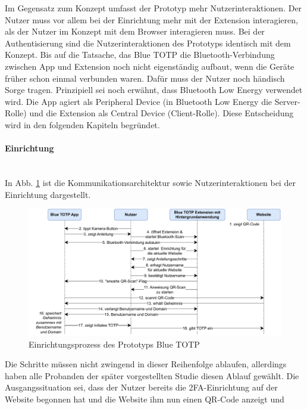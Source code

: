 Im Gegensatz zum Konzept umfasst der Prototyp mehr Nutzerinteraktionen. Der 
Nutzer muss vor allem bei der Einrichtung mehr mit der Extension 
interagieren, als der Nutzer im Konzept mit dem Browser interagieren muss. 
Bei der Authentisierung sind die Nutzerinteraktionen des Prototyps identisch 
mit dem Konzept. Bis auf die Tatsache, das Blue TOTP die Bluetooth-Verbindung 
zwischen App und Extension noch nicht eigenständig aufbaut, wenn die Geräte 
früher schon einmal verbunden waren. Dafür muss der Nutzer noch händisch 
Sorge tragen. Prinzipiell sei noch erwähnt, dass Bluetooth Low Energy 
verwendet wird. Die App agiert als Peripheral Device (in Bluetooth Low Energy die 
Server-Rolle) und die Extension als Central Device (Client-Rolle). Diese 
Entscheidung wird in den folgenden Kapiteln begründet.

\paragraph*{Einrichtung}
\mbox{} \vspace{0.1cm} \\
In Abb. \ref{fig: prototyp kommunikation ablauf einrichtung} ist die 
Kommunikationsarchitektur sowie Nutzerinteraktionen bei der Einrichtung 
dargestellt.
\begin{figure}[h]
    \centering
    \includegraphics[width=1\linewidth]{figures/impl/blue_totp_setup.pdf}
    \caption[Einrichtungsprozess des Prototyps Blue TOTP]{Einrichtungsprozess des Prototyps Blue TOTP}
    \label{fig: prototyp kommunikation ablauf einrichtung}
\end{figure}
Die Schritte müssen nicht zwingend in dieser Reihenfolge ablaufen, allerdings 
haben alle Probanden der später vorgestellten Studie diesen Ablauf gewählt. 
Die Ausgangssituation sei, dass der Nutzer bereits die 2FA-Einrichtung auf 
der Website begonnen hat und die Website ihm nun einen QR-Code anzeigt und 
